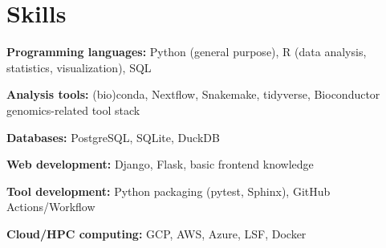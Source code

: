 \section{Skills}

\begin{entrylist}[itemsep=0.5ex]

\item \textbf{Programming languages:}
    Python (general purpose),
    R (data analysis, statistics, visualization),
    SQL

\item \textbf{Analysis tools:} (bio)conda, Nextflow, Snakemake, tidyverse, Bioconductor genomics-related tool stack

\item \textbf{Databases:} PostgreSQL, SQLite, DuckDB

\item \textbf{Web development:} Django, Flask, basic front\-end knowledge

\item \textbf{Tool development:} Python packaging (pytest, Sphinx), GitHub Actions/Workflow

\item \textbf{Cloud/HPC computing:} GCP, AWS, Azure, LSF, Docker

\end{entrylist}
